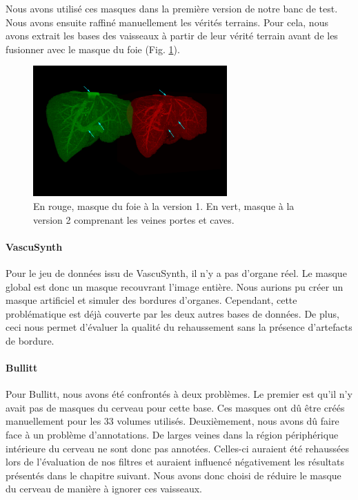 Nous avons utilisé ces masques dans la première version de notre banc de test. Nous avons ensuite raffiné manuellement les vérités terrains. Pour cela, nous avons extrait les bases des vaisseaux à partir de leur  vérité terrain avant de les fusionner avec le masque du foie (Fig. \ref{fig:masques_globaux_ircad}).

\begin{figure}[!ht]
  \centering
  \includegraphics[height=5cm]{Images/ircad_corrected_gt.png}
  \caption{En rouge, masque du foie à la version 1. En vert, masque à la version 2 comprenant les veines portes et caves.}
  \label{fig:masques_globaux_ircad}
\end{figure}

\paragraph{VascuSynth}
Pour le jeu de données issu de VascuSynth, il n'y a pas d'organe réel. Le masque global est donc un masque recouvrant l'image entière. Nous aurions pu créer un masque artificiel et simuler des bordures d'organes. Cependant, cette problématique est déjà couverte par les deux autres bases de données. De plus, ceci nous permet d'évaluer la qualité du rehaussement sans la présence d'artefacts de bordure.

\paragraph{Bullitt}
Pour Bullitt, nous avons été confrontés à deux problèmes. Le premier est qu'il n'y avait pas de masques du cerveau pour cette base. Ces masques ont dû être créés manuellement pour les 33 volumes utilisés. Deuxièmement, nous avons dû faire face à un problème d'annotations.  De larges veines dans la région périphérique intérieure du cerveau ne sont donc pas annotées. Celles-ci auraient été rehaussées lors de l'évaluation de nos filtres et auraient influencé négativement les résultats présentés dans le chapitre suivant. Nous avons donc choisi de réduire le masque du cerveau de manière à ignorer ces vaisseaux.

